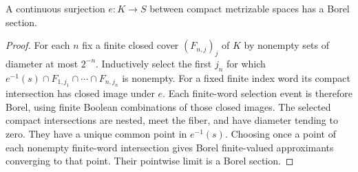 \begin{lemma}\label{lem:selector}
A continuous surjection $e:K\to S$ between compact metrizable spaces has a Borel section.
\end{lemma}
\begin{proof}
For each $n$ fix a finite closed cover $(F_{n,j})_j$ of $K$ by nonempty sets of diameter at most $2^{-n}$. Inductively select the first $j_n$ for which $e^{-1}(s)\cap F_{1,j_1}\cap\cdots\cap F_{n,j_n}$ is nonempty. For a fixed finite index word its compact intersection has closed image under $e$. Each finite-word selection event is therefore Borel, using finite Boolean combinations of those closed images. The selected compact intersections are nested, meet the fiber, and have diameter tending to zero. They have a unique common point in $e^{-1}(s)$. Choosing once a point of each nonempty finite-word intersection gives Borel finite-valued approximants converging to that point. Their pointwise limit is a Borel section.
\end{proof}

